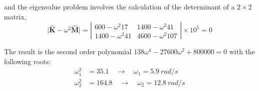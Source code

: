 \begin{Answer}[ref={three_storey_helicopter}]
and the eigenvalue problem involves the calculation of the determinant of a $2\times2$ matrix,
$$
\vert \hat{\mathbf{K}} - \omega^2 \hat{\mathbf{M}} \vert =
\left\vert \begin{matrix}
    600 -\omega^2 17 & 1400 -\omega^2 41 \\
    1400 -\omega^2 41 & 4600 -\omega^2 107
\end{matrix}
\right\vert \times 10^5 = 0
$$

The result is the second order polynomial
$
138 \omega^4 - 27600 \omega^2 + 800000 = 0
$ with the following roots:
\begin{align*}
\omega_1^2& = 35.1 \quad \rightarrow \quad \omega_1 = \SI{5.9}{rad/s} \\
\omega_2^2& = 164.8 \quad \rightarrow \quad \omega_2 = \SI{12.8}{rad/s} \\
\end{align*}


    
\end{Answer}
